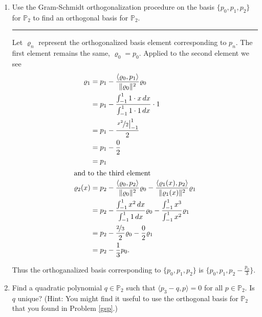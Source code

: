 \documentclass[12pt]{amsart}
\newcommand{\1}{\mathbbm{1}}
\numberwithin{equation}{section}
\numberwithin{Theorem}{section}
\theoremstyle{plain} %
\theoremstyle{definition}
\theoremstyle{remark}
\begin{document}
\begin{enumerate}[1.]
\begin{enumerate}[(a)]
	


\end{enumerate}



\item\label{gsp} Use the Gram-Schmidt orthogonalization procedure on the basis \(\{p_{0},p_{1},p_{2}\}\) for \(\mathbb{P}_{2}\) to find an orthogonal basis for \(\mathbb{P}_{2}\).\bigskip

\hrule
\bigskip

Let \(\varrho_n\) represent the orthogonalized basis element corresponding to \(p_n\).
The first element remains the same, \(\varrho_0=p_0\). 
Applied to the second element we see
\begin{align*}
	\varrho_1
	&=p_1-\frac{\langle\varrho_0,p_1\rangle}{\|\varrho_0\|^2}\varrho_0 \\
	&=p_1-\frac{\int_{-1}^{1}1\cdot x\,dx}{\int_{-1}^{1}1\cdot1\,dx}\cdot1 \\
	&=p_1-\frac{\left.\nicefrac{x^2}{2}\right|_{-1}^1}{2} \\
	&=p_1-\frac{0}{2} \\
	&=p_1 \\
\intertext{and to the third element}
	\varrho_2(x)
	&=p_2-\frac{\langle\varrho_0,p_2\rangle}{\|\varrho_0\|^2}\varrho_0 -\frac{\langle\varrho_1(x),p_2\rangle}{\|\varrho_1(x)\|^2}\varrho_1 \\
	&=p_2-\frac{\int_{-1}^{1}x^2\,dx}{\int_{-1}^{1}1\,dx}\varrho_0 -\frac{\int_{-1}^{1}x^3}{\int_{-1}^{1}x^2}\varrho_1 \\
	&=p_2-\frac{\nicefrac{2}{3}}{2}\varrho_0 -\frac{0}{2}\varrho_1 \\
	&=p_2-\frac{1}{3}p_0. \\
\end{align*}

Thus the orthoganalized basis corresponding to \(\{p_0,p_1,p_2\}\) is \(\{p_0,p_1,p_2-\frac{p_0}{3}\}\).

\clearpage

\item Find a quadratic polynomial \(q\in\mathbb{P}_{2}\) such that \(\langle p_{3}-q,p\rangle = 0\) for all \(p\in\mathbb{P}_{2}\). Is \(q\) unique? (Hint: You might find it useful to use the orthogonal basis for \(\mathbb{P}_{2}\) that you found in Problem \ref{gsp}.) \bigskip


\end{enumerate}
\end{document}
